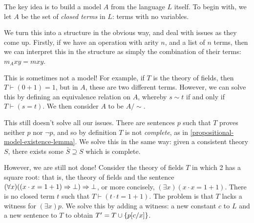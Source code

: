 \documentclass{article}
\begin{document}
\begin{prf}
    The key idea is to build a model $A$ from the language $L$ itself. To begin with, we let $A$ be the set of \textit{closed terms} in $L$: terms with no variables.
    
    We turn this into a structure in the obvious way, and deal with issues as they come up. Firstly, if we have an operation with arity $n$, and a list of $n$ terms, then we can interpret this in the structure as simply the combination of their terms: $m_A xy=mxy$.
    
    This is sometimes not a model! For example, if $T$ is the theory of fields, then $T \vdash (0 + 1) = 1$, but in $A$, these are two different terms. However, we can solve this by defining an equivalence relation on $A$, whereby $s \sim t$ if and only if $T \vdash (s = t)$. We then consider $A$ to be $A/\sim$.
    
    This still doesn't solve all our issues. There are sentences $p$ such that $T$ proves neither $p$ nor $\lnot p$, and so by definition $T$ is not \textit{complete}, as in \ref{propositional-model-existence-lemma}. We solve this in the same way: given a consistent theory $S$, there exists some $\bar S \supseteq S$ which is complete.
    
    However, we are still not done! Consider the theory of fields $T$ in which 2 has a square root: that is, the theory of fields and the sentence $(\forall x)((x \cdot x = 1 + 1) \Rightarrow \bot) \Rightarrow \bot$, or more concisely, $(\exists x)(x\cdot x = 1+1)$. There is no closed term $t$ such that $T \vdash (t \cdot t = 1 + 1)$. The problem is that $T$ lacks a witness for $(\exists x)p$. We solve this by adding a witness: a new constant $c$ to $L$ and a new sentence to $T$ to obtain $T' = T \cup \left\lbrace p[c/x] \right\rbrace$.
    

\end{prf}
\end{document}
